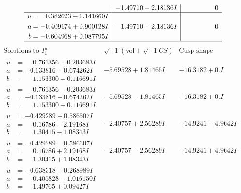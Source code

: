 \documentclass[1p]{elsarticle_modified}
\theoremstyle{definition}
\newcommand{\I}{\sqrt{-1}}
\begin{document}
$$\begin{array}{c|c|c}
 & -1.49710 - 2.18136 I & \phantom{-0.000000 } 0 \\ \hline\begin{aligned}
u &= \phantom{-}0.382623 - 1.141660 I \\
a &= -0.409174 + 0.900128 I \\
b &= -0.604968 + 0.087795 I\end{aligned}
 & -1.49710 + 2.18136 I & \phantom{-0.000000 } 0\\
 \hline 
 \end{array}$$\newpage$$\begin{array}{c|c|c}  
\text{Solutions to }I^u_{1}& \I (\text{vol} + \sqrt{-1}CS) & \text{Cusp shape}\\
 \hline 
\begin{aligned}
u &= \phantom{-}0.761356 + 0.203683 I \\
a &= -0.133816 + 0.674262 I \\
b &= \phantom{-}1.153300 - 0.116691 I\end{aligned}
 & -5.69528 + 1.81465 I & -16.3182 + 0. I\phantom{ +0.000000I} \\ \hline\begin{aligned}
u &= \phantom{-}0.761356 - 0.203683 I \\
a &= -0.133816 - 0.674262 I \\
b &= \phantom{-}1.153300 + 0.116691 I\end{aligned}
 & -5.69528 - 1.81465 I & -16.3182 + 0. I\phantom{ +0.000000I} \\ \hline\begin{aligned}
u &= -0.429289 + 0.586607 I \\
a &= \phantom{-}0.16786 - 2.19168 I \\
b &= \phantom{-}1.30415 - 1.08343 I\end{aligned}
 & -2.40757 + 2.56289 I & -14.9241 - 4.9642 I \\ \hline\begin{aligned}
u &= -0.429289 - 0.586607 I \\
a &= \phantom{-}0.16786 + 2.19168 I \\
b &= \phantom{-}1.30415 + 1.08343 I\end{aligned}
 & -2.40757 - 2.56289 I & -14.9241 + 4.9642 I \\ \hline\begin{aligned}
u &= -0.638318 + 0.268989 I \\
a &= \phantom{-}0.405828 - 1.016150 I \\
b &= \phantom{-}1.49765 + 0.09427 I\end{aligned}

\end{array}$$
\end{document}

